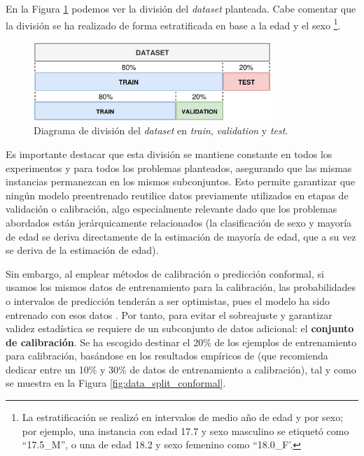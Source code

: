 En la Figura \ref{fig:data_split_base} podemos ver la división del \textit{dataset} planteada. Cabe comentar que la división se ha realizado de forma estratificada en base a la edad y el sexo%
\footnote{
    La estratificación se realizó en intervalos de medio año de edad y por sexo; por ejemplo, una instancia con edad 17.7 y sexo masculino se etiquetó como ``17.5\_M'', o una de edad 18.2 y sexo femenino como ``18.0\_F'.
}.

\begin{figure}[htbp]
    \centering
    \includegraphics[width=0.8\textwidth]{capitulos/cap_04/imagenes/data_split_base.png}
    \caption[
        Diagrama de división del \textit{dataset} en \textit{train}, \textit{validation} y \textit{test}.
    ]{
        Diagrama de división del \textit{dataset} en \textit{train}, \textit{validation} y \textit{test}. 
    } 
    \label{fig:data_split_base}
\end{figure}

Es importante destacar que esta división se mantiene constante en todos los experimentos y para todos los problemas planteados, asegurando que las mismas instancias permanezcan en los mismos subconjuntos. Esto permite garantizar que ningún modelo preentrenado reutilice datos previamente utilizados en etapas de validación o calibración, algo especialmente relevante dado que los problemas abordados están jerárquicamente relacionados (la clasificación de sexo y mayoría de edad se deriva directamente de la estimación de mayoría de edad, que a su vez se deriva de la estimación de edad).

Sin embargo, al emplear métodos de calibración o predicción conformal, si usamos los mismos datos de entrenamiento para la calibración, las probabilidades o intervalos de predicción tenderán a ser optimistas, pues el modelo ha sido entrenado con esos datos \cite{niculescu2005}. Por tanto, para evitar el sobreajuste y garantizar validez estadística se requiere de un subconjunto de datos adicional: el \textbf{conjunto de calibración}. Se ha escogido destinar el  20\% de los ejemplos de entrenamiento para calibración, basándose en los resultados empíricos de \cite{sesia2020} (que recomienda dedicar entre un 10\% y 30\% de datos de entrenamiento a calibración), tal y como se muestra en la Figura \ref{fig:data_split_conformal}.

